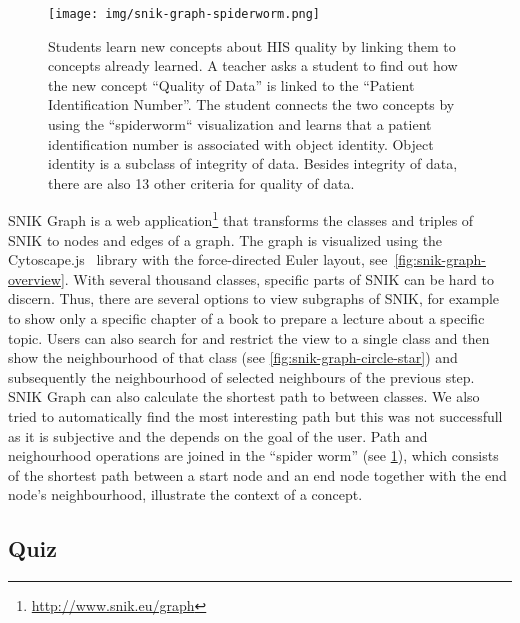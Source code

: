 \documentclass[conference]{IEEEtran}
\newcommand{\citep}{\cite}%
\begin{document}
\begin{figure}
\caption{Students learn new concepts about HIS quality by linking them to concepts already learned.
A teacher asks a student to find out how the new concept \enquote{Quality of Data} is linked to the \enquote{Patient Identification Number}.
The student connects the two concepts by using the “spiderworm“ visualization and learns that a patient identification number is associated with object identity.
Object identity is a subclass of integrity of data.
Besides integrity of data, there are also 13 other criteria for quality of data.}
\label{fig:snik-graph-spiderworm}
\texttt{[image: img/snik-graph-spiderworm.png]}
\end{figure}
SNIK Graph is a web application\footnote{\url{http://www.snik.eu/graph}} that transforms the classes and triples of SNIK to nodes and edges of a graph.
The graph is visualized using the Cytoscape.js~\citep{cytoscape} library with the force-directed Euler layout, see~\cref{fig:snik-graph-overview}.
With several thousand classes, specific parts of SNIK can be hard to discern.
Thus, there are several options to view subgraphs of SNIK, for example to show only a specific chapter of a book to prepare a lecture about a specific topic.
Users can also search for and restrict the view to a single class and then show the neighbourhood of that class (see \cref{fig:snik-graph-circle-star}) and subsequently the neighbourhood of selected neighbours of the previous step.
SNIK Graph can also calculate the shortest path to between classes.
We also tried to automatically find the most interesting path but this was not successfull as it is subjective and the depends on the goal of the user.
Path and neighourhood operations are joined in the \enquote{spider worm} (see \cref{fig:snik-graph-spiderworm}), which consists of the shortest path between a start node and an end node together with the end node’s neighbourhood, illustrate the context of a concept.
\fi
\subsection{Quiz}
\end{document}
